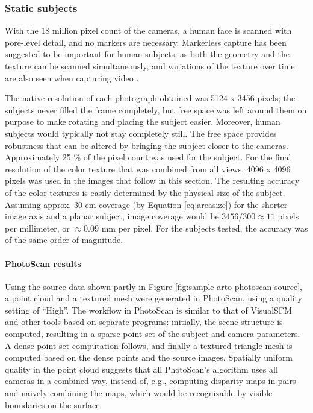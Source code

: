 \subsubsection{Static subjects}

With the 18 million pixel count of the cameras, a human face is scanned with pore-level detail, and no markers are necessary.
Markerless capture has been suggested to be important for human subjects, as both the geometry and the texture can be scanned simultaneously, and variations of the texture over time are also seen when capturing video \cite{bradley2010high}.

The native resolution of each photograph obtained was 5124 x 3456 pixels; the subjects never filled the frame completely, but free space was left around them on purpose to make rotating and placing the subject easier.
Moreover, human subjects would typically not stay completely still.
The free space provides robustness that can be altered by bringing the subject closer to the cameras.
Approximately 25 \% of the pixel count was used for the subject.
For the final resolution of the color texture that was combined from all views, 4096 x 4096 pixels was used in the images that follow in this section.
The resulting accuracy of the color textures is easily determined by the physical size of the subject.
Assuming approx. 30 cm coverage (by Equation \ref{eq:areasize}) for the shorter image axis and a planar subject, image coverage would be $3456 / 300 \approx 11$ pixels per millimeter, or $\approx 0.09$ mm per pixel.
For the subjects tested, the accuracy was of the same order of magnitude.

\paragraph{PhotoScan results}
Using the source data shown partly in Figure \ref{fig:sample-arto-photoscan-source}, a point cloud and a textured mesh were generated in PhotoScan, using a quality setting of ``High''.
The workflow in PhotoScan is similar to that of VisualSFM and other tools based on separate programs:
initially, the scene structure is computed, resulting in a sparse point set of the subject and camera parameters.
A dense point set computation follows, and finally a textured triangle mesh is computed based on the dense points and the source images.
Spatially uniform quality in the point cloud suggests that all PhotoScan's algorithm uses all cameras in a combined way, instead of, e.g., computing disparity maps in pairs and naively combining the maps, which would be recognizable by visible boundaries on the surface.

